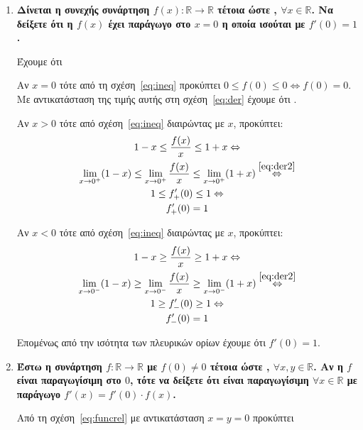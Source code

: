 \documentclass[a4paper,table]{report}
\begin{document}
\begin{enumerate}
	\item {\bfseries\boldmath Δίνεται η συνεχής συνάρτηση 
      $ f(x) \colon\mathbb{R}\to \mathbb{R} $ τέτοια ώστε 
      , 
    $ \forall x \in \mathbb{R} $. Να δείξετε ότι η $ f(x) $ έχει παράγωγο στο 
    $ x=0 $ η οποία ισούται με $ f'(0)=1 $.}
  \begin{solution}
		Έχουμε ότι  

		Αν $ x=0 $ τότε από τη σχέση~\eqref{eq:ineq} προκύπτει $ 0 \leq f(0) \leq 0
		\Leftrightarrow f(0) = 0$. Με αντικατάσταση της τιμής αυτής στη
		σχέση~\eqref{eq:der} έχουμε ότι .
		
		\begin{minipage}{0.45\textwidth}
		Αν $ x>0 $ τότε από σχέση~\eqref{eq:ineq} διαιρώντας με $x$, προκύπτει:
		\begin{gather*}
			1-x \leq \frac{f(x)}{x} \leq 1+x \Leftrightarrow \\ 
			\lim_{x\to 0^{+}}(1-x) \leq \lim_{x\to 0^{+}} \frac{f(x)}{x}
			\leq \lim_{x\to 0^{+}} (1+x)\overset{\eqref{eq:der2}}\Leftrightarrow
			\\
			1 \leq f_{+}'(0) \leq 1 \Leftrightarrow \\
			f_{+}'(0) = 1
		\end{gather*}
		\end{minipage} \hfill 
		\begin{minipage}{0.45\textwidth}
		Αν $ x<0 $ τότε από σχέση~\eqref{eq:ineq} διαιρώντας με $x$, προκύπτει:
			\begin{gather*}
			1-x \geq \frac{f(x)}{x} \geq 1+x \Leftrightarrow \\ 
			\lim_{x\to 0^{-}}(1-x) \geq \lim_{x\to 0^{-}} \frac{f(x)}{x}
			\geq \lim_{x\to 0^{-}} (1+x)\overset{\eqref{eq:der2}}\Leftrightarrow
			\\
			1 \geq f_{-}'(0) \geq 1 \Leftrightarrow \\
			f_{-}'(0) = 1
			\end{gather*}
		\end{minipage} 

		Επομένως από την ισότητα των πλευρικών ορίων έχουμε ότι $ f'(0) = 1 $.
  \end{solution}

	\item {\bfseries \boldmath Έστω η συνάρτηση $ f \colon \mathbb{R} \to \mathbb{R} $ 
      με $ f(0) \neq 0	$ τέτοια ώστε , $ \forall x,y \in \mathbb{R} $. Αν η $f$ είναι παραγωγίσιμη στο $0$, τότε να 
  δείξετε ότι είναι παραγωγίσιμη $ \forall x \in \mathbb{R} $ με παράγωγο 
  $ f'(x) = f'(0) \cdot f(x) $.}
  \begin{solution}
		Από τη σχέση~\eqref{eq:funcrel} με αντικατάσταση $ x=y=0 $ προκύπτει
		

\end{solution}
\end{enumerate}
\end{document}
